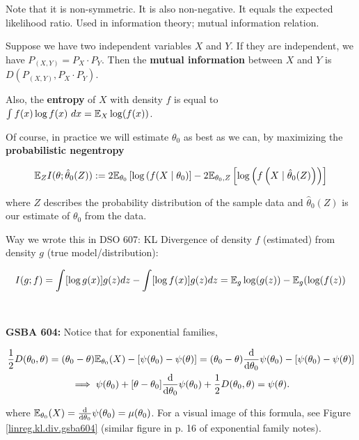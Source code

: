 Note that it is non-symmetric. It is also non-negative. It equals the expected likelihood ratio. Used in information theory; mutual information relation. 


\begin{definition}

Suppose we have two independent variables \(X\) and \(Y\). If they are independent, we have \(P_{(X,Y)} = P_X \cdot P_Y\). Then the \textbf{mutual information} between \(X\) and \(Y\) is \(D(P_{(X, Y)}, P_X \cdot P_Y)\). 

\end{definition}

Also, the \textbf{entropy} of \(X\) with density \(f\) is equal to \(\int f(x) \log f(x) \ dx = \mathbb{E}_X \log (f(x))\). 

Of course, in practice we will estimate \(\theta_0\) as best as we can, by maximizing the \textbf{probabilistic negentropy}

\[
\mathbb{E}_Z I(\theta; \hat{\theta}_0(Z)) := 2\mathbb{E}_{\theta_0} \left[ \log \left( f(X \mid \theta_0 \right) \right] - 2 \mathbb{E}_{\theta_0, Z} \left[ \log \left( f \left(X \mid \hat{\theta}_0(Z) \right) \right) \right]
\]

where \(Z\) describes the probability distribution of the sample data and \(\hat{\theta}_0(Z)\) is our estimate of \(\theta_0\) from the data.

Way we wrote this in DSO 607: KL Divergence of density \(f\) (estimated) from density \(g\) (true model/distribution):

\[
I(g; f) = \int[\log g(x) ] g(z) dz - \int [\log f(x)] g(z) dz = \mathbb{E}_g \log(g(z)) - \mathbb{E}_g(\log(f(z))
\]



\

\textbf{GSBA 604:} Notice that for exponential families,

\begin{multline*}
 \frac{1}{2} D(\theta_0, \theta) = (\theta_0 - \theta) \mathbb{E}_{\theta_0}(X) - [ \psi(\theta_0) - \psi(\theta)] = (\theta_0 - \theta) \frac{\mathrm{d} }{\mathrm{d} \theta_0} \psi(\theta_0)  - [ \psi(\theta_0) - \psi(\theta)] 
 \\ \implies \psi(\theta_0) + [ \theta - \theta_0]  \frac{\mathrm{d} }{\mathrm{d} \theta_0} \psi(\theta_0) +  \frac{1}{2} D(\theta_0, \theta) = \psi(\theta).
\end{multline*}

where \( \mathbb{E}_{\theta_0}(X)  = \frac{\mathrm{d} }{\mathrm{d} \theta_0} \psi(\theta_0) = \mu(\theta_0)\). For a visual image of this formula, see Figure \ref{linreg.kl.div.gsba604} (similar figure in p. 16 of exponential family notes).


